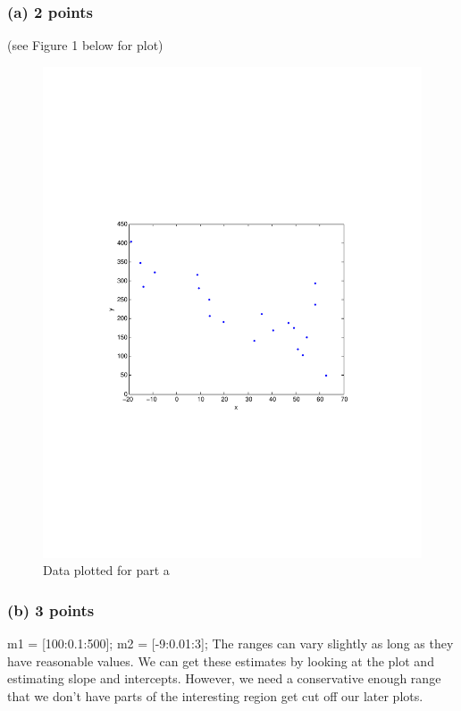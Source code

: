 \documentclass[11pt]{article}
\begin{document}
\subsubsection*{(a) 2 points}
(see Figure 1 below for plot)
\begin{figure}[htbp]
	\centerline{\includegraphics[width=1\textwidth]{Plot_Data.pdf}}
	\caption{\label{p1}%
	Data plotted for part a}
\end{figure}

\subsubsection*{(b) 3 points}
m1 = [100:0.1:500];
m2 = [-9:0.01:3];
The ranges can vary slightly as long as they have reasonable values.  We can get these estimates by looking at the plot and estimating slope and intercepts.  However, we need a conservative enough range that we don't have parts of the interesting region get cut off our later plots.
\end{document}
